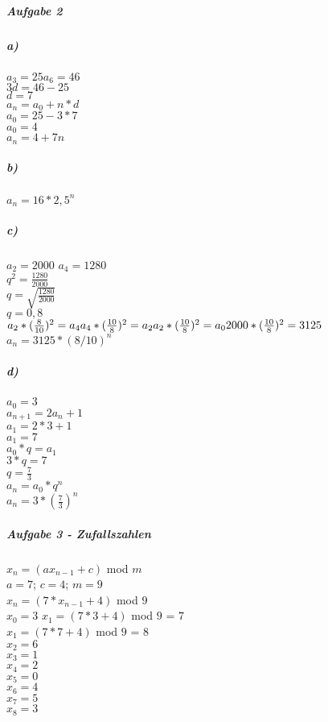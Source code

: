 \documentclass{article}
\begin{document}
	\subparagraph*{Aufgabe 2}
	
	\subparagraph*{a)}
	
	$a_{3} = 25 a_{6} = 46$ \\
	$3d = 46 - 25$ \\
	$d = 7$ \\
	$a_{n} = a_0 + n * d$ \\
	$a_{0} = 25 - 3 * 7$ \\
	$a_{0} = 4$ \\
	$a_{n} = 4 + 7n$ \\
	
	\subparagraph*{b)}
	$a_{n} = 16 * 2,5^{n}$
	
	\subparagraph*{c)}
	$a_{2} = 2000$ $a_{4} = 1280$ \\
	$q^{2} = \frac{1280}{2000}$ \\
	$q = \sqrt{\frac{1280}{2000}}$ \\
	$q = 0,8$ \\
	$a_{2} * (\frac{8}{10})^{2} = a_{4} \\
	a_{4} * (\frac{10}{8})^{2} = a_{2} \\
	a_{2} * (\frac{10}{8})^{2} = a_{0} \\
	2000 * (\frac{10}{8})^{2} = 3125 \\$ \\
	$a_{n} = 3125 * (8/10)^{n}$ \\
	
	\subparagraph*{d)}
	$a_{0} = 3$ \\
	$a_{n + 1} = 2a_{n} + 1$ \\
	$a_{1} = 2 * 3 + 1$ \\
	$a_{1} = 7$ \\
	$a_{0} * q = a_{1}$ \\
	$3 * q = 7$ \\
	$q = \frac{7}{3}$ \\
	$a_{n} = a_{0} * q^{n}$ \\
	$a_{n} = 3 * (\frac{7}{3})^{n}$ \\
	
	\subparagraph*{Aufgabe 3 - Zufallszahlen}
	$x_{n} = (ax_{n-1} + c)$ mod $m$ \\
	$a = 7$; $c = 4$; $m = 9$ \\
	$x_{n} = (7*x_{n-1} + 4)$ mod $9$ \\
	$x_{0}  = 3$
	$x_{1} = (7*3+ 4)$ mod $9$ = $7$ \\
	$x_{1} = (7*7 +4)$ mod $9$ = 8 \\
	$x_{2} = 6$\\
	$x_{3} = 1 $ \\
	$x_{4} = 2$ \\
	$x_{5} = 0$ \\
	$x_{6} = 4$ \\
	$x_{7} = 5$ \\
	$x_{8} = 3$ \\

	
	
				
\end{document}
